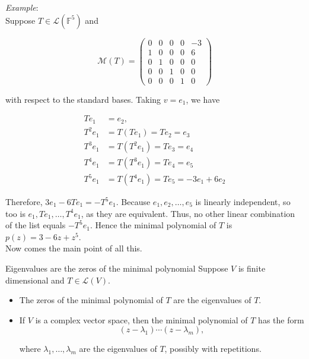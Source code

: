 \documentclass[svgnames]{article}     %
\begin{document}
\textit{Example}: \mbox{} \\ 

Suppose $T \in \mathcal{L}(\mathbb{F}^5)$ and 

\[
\mathcal{M} (T) = \begin{pmatrix}
  0 & 0 & 0 & 0 & -3 \\ 
  1 & 0 & 0 & 0 & 6 \\
  0 & 1 & 0 & 0 & 0 \\
  0 & 0 & 1 & 0 & 0 \\
  0 & 0 & 0 & 1 & 0 
\end{pmatrix} 
\] \vspace{3px}

with respect to the standard bases. Taking $v = e_1$, we have 

\begin{align*}
  T e_1 &= e_2, \\
  T^2 e_1 &= T(Te_1) = Te_2 = e_3 \\
  T^3e_1 &= T(T^2 e_1) = Te_3 = e_4 \\ 
  T^4e_1 &= T(T^3 e_1) = Te_4 = e_5 \\ 
  T^{5}e_1 &= T(T^{4}e_1) = Te_5 = -3e_1 + 6e_2 
\end{align*}

Therefore, $3e_1 - 6Te_1 = -T^5 e_1$. Because $e_1, e_2, \hdots, e_5$ is
linearly independent, so too is $e_1, Te_1, \hdots, T^4 e_1$, as they are
equivalent. Thus, no other linear combination of the list equals $-T^5 e_1$.
Hence the minimal polynomial of $T$ is $p(z) = 3 - 6z + z^5$. \\

Now comes the main point of all this. 

\begin{mainbox}{Eigenvalues are the zeros of the minimal polynomial}
  Suppose $V$ is finite dimensional and $T \in \mathcal{L}(V)$.  

  \begin{itemize}
    \item[(a)] The zeros of the minimal polynomial of $T$ are the eigenvalues
      of $T$. 
    \item[(b)] If $V$ is a complex vector space, then the minimal polynomial of
      $T$ has the form 
      \[ (z - \lambda_1) \cdots (z - \lambda_m), \] 
      
      where $\lambda_1, \hdots, \lambda_m$ are the eigenvalues of $T$, possibly
      with repetitions. 
  \end{itemize}
\end{mainbox} \mbox{} \\
\end{document}
